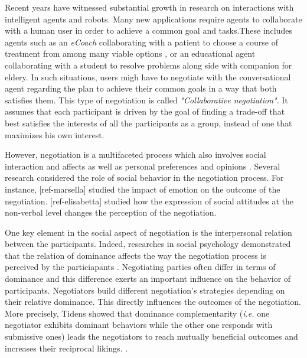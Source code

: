 \documentclass[conference, letterpaper]{IEEEtran}
\begin{document}
		Recent years have witnessed substantial growth in research on interactions with intelligent agents and robots. Many new applications require agents to collaborate with a human user in order to achieve a common goal and tasks.These includes agents such as an \textit{eCoach} collaborating with a patient to choose a course of treatment from among many viable options \cite{robertson2015visual}, or an educational agent collaborating with a student to resolve problems \cite{howard2017shifting} along side with companion for eldery. In such situations, users migh	have to negotiate with the conversational agent
		regarding the plan to achieve their common goals in a way that both satisfies them. This type of negotiation is called \emph{"Collaborative negotiation"}. It assumes that each participant is driven by the goal of finding a trade-off that best satisfies the interests of all the participants as a group, instead of one that maximizes his own interest\cite{sidner1994artificial,chu1995response}.
	
	
		However, negotiation is a multifaceted process which also involves social interaction and affects as well as personal preferences and opinions  \cite{bro2010affective}. Several research considered the role of social behavior in the negotiation process. For instance, [ref-marsella] studied the impact of emotion on the outcome of the negotiation. [ref-elisabetta] studied how the expression of social attitudes at the non-verbal level changes the perception of the negotiation.
	
	One key element in the social aspect of negotiation is the interpersonal relation between the participants. Indeed, researches in social psychology demonstrated that the relation of dominance affects the way the negotiation process is perceived by the particiapants \cite{van2006power}.  
	Negotiating parties often differ in terms of dominance and this difference exerts an important influence on the behavior of participants. Negotiators build different negotiation's strategies depending on their relative dominance. This directly influences the outcomes of the negotiation. More precisely, Tidens \cite{tiedens2003power} showed that dominance complementarity (\emph{i.e.} one negotiator exhibits dominant behaviors while the other one responds with submissive ones) leads the negotiators to reach mutually beneficial outcomes and increases their reciprocal likings. \cite{wiltermuth2015benefits,tiedens2003power}.
	
\end{document}
